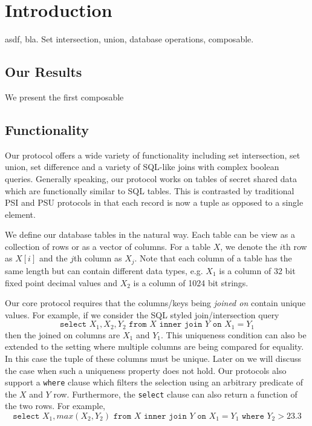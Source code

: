 \section{Introduction}

asdf, bla. Set intersection, union, database operations, composable.







\subsection{Our Results}

We present the first composable



\subsection{Functionality}

Our protocol offers a wide variety of functionality including set intersection, set union, set difference and a variety of SQL-like joins with complex boolean queries. Generally speaking, our protocol works on tables of secret shared data which are functionally similar to SQL tables. This is contrasted by traditional PSI and PSU protocols in that each record is now a tuple as opposed to a single element. 

We define our database tables in the natural way. Each table can be view as a collection of rows or as a vector of columns. For a table $X$, we denote the $i$th row as $X[i]$ and the $j$th column as $X_j$. Note that each column of a table has the same length but can contain different data types, e.g. $X_1$ is a column of 32 bit fixed point decimal values and $X_2$ is a column of 1024 bit strings.

Our core protocol requires that the columns/keys being \emph{joined on} contain unique values. For example, if we consider the SQL styled join/intersection query
$$
\texttt{select } X_1, X_2, Y_2 \texttt{ from } X \texttt{ inner join } Y \texttt{ on } X_1 = Y_1
$$
then the joined on columns are $X_1$ and $Y_1$. This uniqueness condition can also be extended to the setting where multiple columns are being compared for equality. In this case the tuple of these columns must be unique. Later on we will discuss the case when such a uniqueness property does not hold. Our protocols also support a \texttt{where} clause which filters the selection using an arbitrary predicate of the $X$ and $Y$ row. Furthermore, the \texttt{select} clause can also return a function of the two rows. For example,
$$
\texttt{select } X_1,max(X_2, Y_2)  \texttt{ from } X \texttt{ inner join } Y \texttt{ on } X_1 = Y_1 \texttt{ where } Y_2 > 23.3
$$

